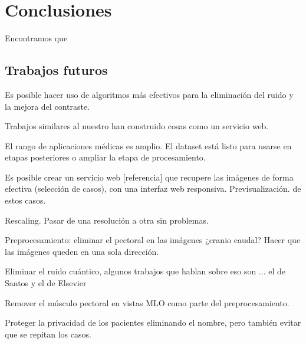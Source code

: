 \chapter{Conclusiones}
\label{conclusiones}

Encontramos que 

\section{Trabajos futuros}

Es posible hacer uso de algoritmos más efectivos para la eliminación del ruido y
la mejora del contraste. 

Trabajos similares al nuestro \cite{heath2000digital} han construido cosas como
un servicio web.

El rango de aplicaciones médicas es amplio. El dataset está listo para usarse
en etapas posteriores o ampliar la etapa de procesamiento.

Es posible crear un servicio web [referencia] que recupere las imágenes de
forma efectiva (selección de casos), con una interfaz web responsiva.
Previsualización. de estos casos.

Rescaling. Pasar de una resolución a otra sin problemas.

Preprocesamiento: eliminar el pectoral en las imágenes ¿cranio caudal?
Hacer que las imágenes queden en una sola dirección.

Eliminar el ruido cuántico, algunos trabajos que hablan sobre eso son ... el de
Santos y el de Elsevier

Remover el músculo pectoral en vistas MLO como parte del preprocesamiento.

Proteger la privacidad de los pacientes eliminando el nombre, pero también evitar
que se repitan los casos.
